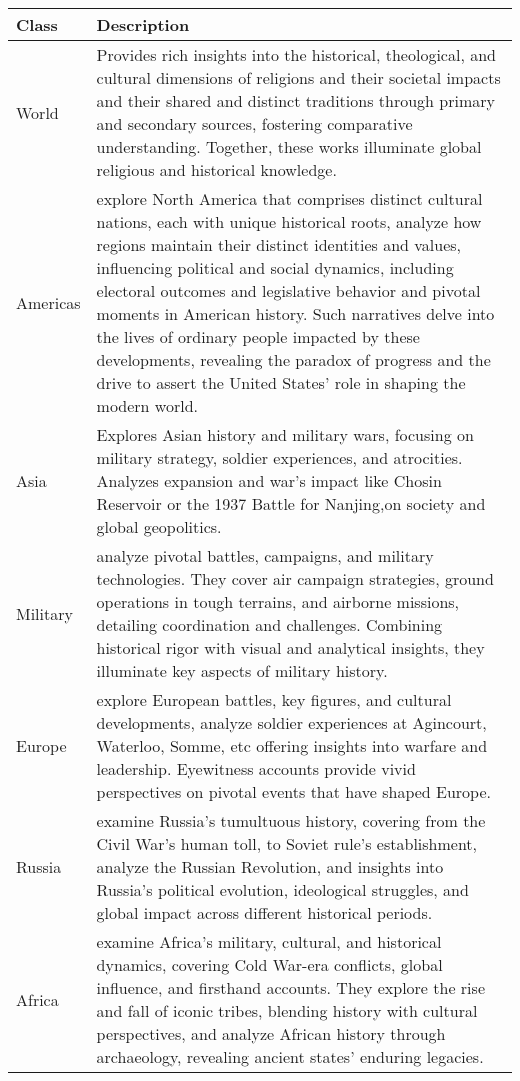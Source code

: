 \begin{table}[h]
\scriptsize
\begin{tabular}{|p{2cm}|p{14.0cm}|}
\toprule
Class & Description \\ \midrule
World & Provides rich insights into the historical, theological, and cultural dimensions of religions and their societal impacts and their shared and distinct traditions through primary and secondary sources, fostering comparative understanding. Together, these works illuminate global religious and historical knowledge. \\ \midrule
Americas & explore North America that comprises distinct cultural nations, each with unique historical roots, analyze how regions maintain their distinct identities and values, influencing political and social dynamics, including electoral outcomes and legislative behavior and pivotal moments in American history. Such narratives delve into the lives of ordinary people impacted by these developments, revealing the paradox of progress and the drive to assert the United States' role in shaping the modern world. \\ \midrule
Asia & Explores Asian history and military wars, focusing on military strategy, soldier experiences, and atrocities. Analyzes expansion and war's impact like Chosin Reservoir or the 1937 Battle for Nanjing,on society and global geopolitics. \\ \midrule
Military & analyze pivotal battles, campaigns, and military technologies. They cover air campaign strategies, ground operations in tough terrains, and airborne missions, detailing coordination and challenges. Combining historical rigor with visual and analytical insights, they illuminate key aspects of military history. \\ \midrule
Europe & explore European battles, key figures, and cultural developments, analyze soldier experiences at Agincourt, Waterloo, Somme, etc offering insights into warfare and leadership. Eyewitness accounts provide vivid perspectives on pivotal events that have shaped Europe. \\ \midrule
Russia & examine Russia’s tumultuous history, covering from the Civil War’s human toll, to Soviet rule’s establishment, analyze the Russian Revolution, and insights into Russia’s political evolution, ideological struggles, and global impact across different historical periods. \\ \midrule
Africa & examine Africa’s military, cultural, and historical dynamics, covering Cold War-era conflicts, global influence, and firsthand accounts. They explore the rise and fall of iconic tribes, blending history with cultural perspectives, and analyze African history through archaeology, revealing ancient states’ enduring legacies. \\ \midrule

\end{tabular}
\end{table}
